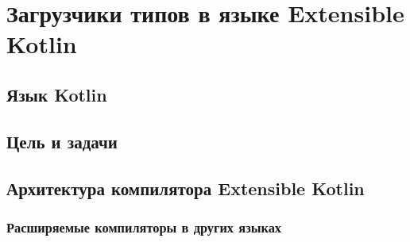 \section{Загрузчики типов в языке Extensible Kotlin}
\subsection{Язык Kotlin}
\subsection{Цель и задачи}
\subsection{Архитектура компилятора Extensible Kotlin}
\subsubsection{Расширяемые компиляторы в других языках}